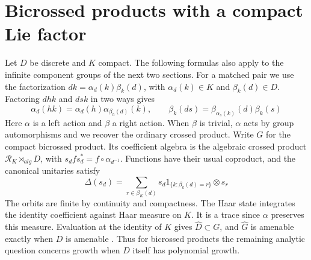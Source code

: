 \documentclass[11pt,a4paper]{article}
\theoremstyle{remark}
\begin{document}
\section{Bicrossed products with a compact Lie factor}\label{secmatched}

Let $D$ be discrete and $K$ compact. The following formulas also apply
to the infinite component groups of the next two sections. For a matched pair we use the
factorization $dk=\alpha_d(k)\beta_k(d)$, with $\alpha_d(k)\in K$ and
$\beta_k(d)\in D$. Factoring $dhk$ and $dsk$ in two ways gives
\[
 \alpha_d(hk)=\alpha_d(h)\alpha_{\beta_h(d)}(k),\qquad
 \beta_k(ds)=\beta_{\alpha_s(k)}(d)\beta_k(s)
\]
Here $\alpha$ is a left action and $\beta$ a right action. When
$\beta$ is trivial, $\alpha$ acts by group automorphisms and we
recover the ordinary crossed product. Write $G$ for
the compact bicrossed product. Its coefficient algebra is the algebraic
crossed product $\mathcal R_K\rtimes_{alg}D$, with
$s_d f s_d^*=f\circ\alpha_{d^{-1}}$. Functions have their usual
coproduct, and the canonical unitaries satisfy
\[
 \Delta(s_d)=\sum_{r\in\beta_K(d)}
 s_d 1_{\{k:\beta_k(d)=r\}}\otimes s_r
\]
The orbits are finite by continuity and compactness. The Haar state
integrates the identity coefficient against Haar measure on $K$. It
is a trace since $\alpha$ preserves this measure. Evaluation at the
identity of $K$ gives $\widehat D\subset G$, and $\widehat G$ is
amenable exactly when $D$ is amenable \cite[Theorem~3.4 and
Corollary~3.7]{fmp}. Thus for bicrossed products the remaining analytic
question concerns growth when $D$ itself has polynomial growth.
\end{document}
